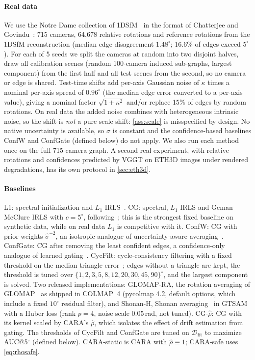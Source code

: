 \paragraph*{Real data} We use the Notre Dame collection of 1DSfM~\cite{wilson2014robust} in the format of Chatterjee and Govindu~\cite{chatterjee2018robust}: 715 cameras, 64,678 relative rotations and reference rotations from the 1DSfM reconstruction (median edge disagreement $1.48^\circ$; 16.6\% of edges exceed $5^\circ$). For each of 5 seeds we split the cameras at random into two disjoint halves, draw all calibration scenes (random 100-camera induced sub-graphs, largest component) from the first half and all test scenes from the second, so no camera or edge is shared. Test-time shifts add per-axis Gaussian noise of $\kappa$ times a nominal per-axis spread of $0.96^\circ$ (the median edge error converted to a per-axis value), giving a nominal factor $\sqrt{1+\kappa^2}$ and/or replace 15\% of edges by random rotations. On real data the added noise combines with heterogeneous intrinsic noise, so the shift is \emph{not} a pure scale shift: \cref{ass:scale} is misspecified by design. No native uncertainty is available, so $\sigma$ is constant and the confidence-based baselines ConfW and ConfGate (defined below) do not apply. We also run each method once on the full 715-camera graph. A second real experiment, with relative rotations and confidences predicted by VGGT on ETH3D images under rendered degradations, has its own protocol in \cref{sec:eth3d}.

\paragraph*{Baselines} L1: spectral initialization and $L_1$-IRLS~\cite{chatterjee2013efficient}. CG: spectral, $L_1$-IRLS and Geman--McClure IRLS with $c=5^\circ$, following~\cite{chatterjee2018robust}; this is the strongest fixed baseline on synthetic data, while on real data $L_1$ is competitive with it. ConfW: CG with prior weights $\hat\sigma^{-2}$, an isotropic analogue of uncertainty-aware averaging~\cite{zhang2023revisiting}. ConfGate: CG after removing the least confident edges, a confidence-only analogue of learned gating~\cite{ahmedt2026geocond}. CycFilt: cycle-consistency filtering with a fixed threshold on the median triangle error~\cite{zach2010disambiguating,enqvist2011nonsequential}; edges without a triangle are kept, the threshold is tuned over $\{1,2,3,5,8,12,20,30,45,90\}^\circ$, and the largest component is solved. Two released implementations: GLOMAP-RA, the rotation averaging of GLOMAP~\cite{pan2024glomap} as shipped in COLMAP~4 (pycolmap 4.2, default options, which include a fixed $10^\circ$ residual filter), and Shonan-H, Shonan averaging~\cite{dellaert2020shonan} in GTSAM with a Huber loss (rank $p=4$, noise scale $0.05$\,rad, not tuned). CG-$\hat\rho$: CG with its kernel scaled by CARA's $\hat\rho$, which isolates the effect of drift estimation from gating. The thresholds of CycFilt and ConfGate are tuned on $\mathcal{D}_{\mathrm{fit}}$ to maximize AUC@5$^\circ$ (defined below). CARA-static is CARA with $\hat\rho\equiv1$; CARA-safe uses \eqref{eq:rhosafe}.

